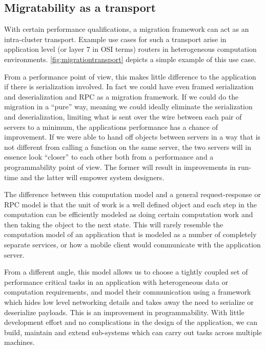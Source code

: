 \subsection{Migratability as a transport}
With certain performance qualifications, a migration framework can act as
an intra-cluster transport. Example use cases for such a transport arise
in application level (or layer 7 in OSI terms) routers in heterogeneous
computation environments. \autoref{fig:migrationtransport} depicts
a simple example of this use case. 


From a performance point of view, this makes little difference to the
application if there is serialization involved. In fact we could have
even framed
serialization and deserialization and RPC as a migration framework. If we
could do the migration in a ``pure'' way, meaning we could ideally
eliminate the serialization and deserialization, limiting what is sent
over the wire between each pair of servers to a minimum, the applications
performance has a chance of improvement. If we were able to hand off
objects between servers in a way that is not different from calling a
function on the same server, the two servers will in essence look
``closer'' to each other both from a performance and a programmability
point of view. The former will result in improvements in run-time and
the latter will empower system designers.

The difference between this computation model and a general
request-response or RPC model is that the unit of work is a
well defined object and each step in the computation can be
efficiently modeled as doing certain computation work and then taking
the object to the next state. This will rarely resemble the computation
model of an application that is modeled as a number of completely separate
services, or how a mobile client would communicate with the application
server.

From a different angle, this model allows us to choose a tightly
coupled set of performance critical tasks in an application with
heterogeneous data or computation requirements, and model their
communication using a framework which hides low level networking details
and takes away the need to serialize or deserialize payloads.
This is an improvement in programmability. With little development
effort and no complications in the design of the application,
we can build, maintain and
extend sub-systems which can carry out tasks across multiple machines.

